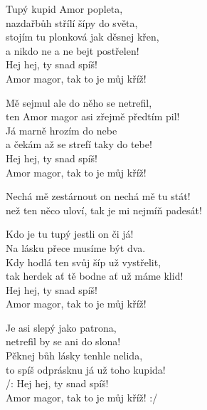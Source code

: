 
\ve{}
Tupý kupid Amor popleta,\\
nazdařbůh střílí šípy do světa,\\
stojím tu plonková jak děsnej křen,\\
a nikdo ne a ne bejt postřelen!\\
Hej hej, ty snad spíš!\\
Amor magor, tak to je můj kříž!

\ve{}
Mě sejmul ale do něho se netrefil,\\
ten Amor magor asi zřejmě předtím pil!\\
Já marně hrozím do nebe\\
a čekám až se strefí taky do tebe!\\
Hej hej, ty snad spíš!\\
Amor magor, tak to je můj kříž!

\cho{}
Nechá mě zestárnout on nechá mě tu stát!\\
než ten něco uloví, tak je mi nejmíň padesát!

\ve{}
Kdo je tu tupý jestli on či já!\\
Na lásku přece musíme být dva.\\
Kdy hodlá ten svůj šíp už vystřelit,\\
tak herdek ať tě bodne ať už máme klid!\\
Hej hej, ty snad spíš!\\
Amor magor, tak to je můj kříž!

\ve{}
Je asi slepý jako patrona,\\
netrefil by se ani do slona!\\
Pěknej bůh lásky tenhle nelida,\\
to spíš odprásknu já už toho kupida!\\
/: Hej hej, ty snad spíš!\\
Amor magor, tak to je můj kříž! :/

\esong{}